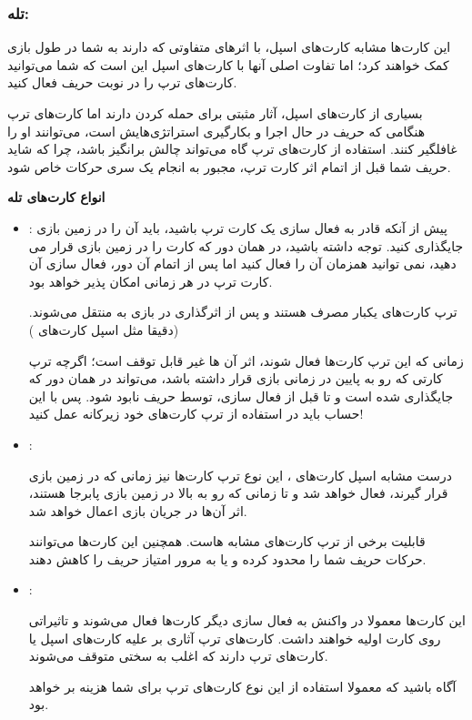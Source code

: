 \documentclass[]{article}
\begin{document}
\subsubsection*{{\titr تله:}}

این کارت‌ها مشابه کارت‌های اسپل، با اثر‌های متفاوتی که دارند به شما در طول بازی کمک خواهند کرد؛ اما تفاوت اصلی آنها با کارت‌های اسپل این است که شما می‌توانید کارت‌های ترپ را در نوبت حریف فعال کنید.

بسیاری از کارت‌های اسپل، آثار مثبتی برای حمله کردن دارند اما کارت‌های ترپ هنگامی که حریف در حال اجرا و بکارگیری استراتژی‌هایش است، می‌توانند او را غافلگیر کنند. استفاده از کارت‌های ترپ گاه می‌تواند چالش برانگیز باشد، چرا که شاید حریف شما قبل از اتمام اثر کارت ترپ، مجبور به انجام یک سری حرکات خاص شود.


\textbf{انواع کارت‌های تله}

\begin{itemize}
	\item {}:
پیش از آنکه قادر به فعال سازی یک کارت ترپ باشید، باید آن را در زمین بازی جایگذاری کنید. توجه داشته باشید، در همان دور که کارت را در زمین بازی قرار می دهید، نمی توانید همزمان آن را فعال کنید اما پس از اتمام آن دور، فعال سازی آن کارت ترپ در هر زمانی امکان پذیر خواهد بود.

ترپ کارت‌های  یکبار مصرف هستند و پس از اثرگذاری در بازی به  منتقل می‌شوند.(دقیقا مثل اسپل کارت‌های )

زمانی که این ترپ کارت‌ها فعال شوند، اثر آن ها غیر قابل توقف است؛ اگرچه ترپ کارتی که رو به پایین در زمانی بازی قرار داشته باشد، می‌تواند در همان دور که جایگذاری شده است و  تا قبل از فعال سازی، توسط حریف نابود شود. پس با این حساب باید در استفاده از ترپ کارت‌های خود زیرکانه عمل کنید!


	\item {}: 
	
درست مشابه اسپل کارت‌های ، این نوع ترپ کارت‌ها نیز زمانی که در زمین بازی قرار گیرند، فعال خواهد شد و تا زمانی که رو به بالا در زمین بازی پابرجا هستند، اثر آن‌ها در جریان بازی اعمال خواهد شد.

قابلیت برخی از ترپ کارت‌های   مشابه    هاست. همچنین این کارت‌ها می‌توانند حرکات حریف شما را محدود کرده و یا به مرور امتیاز حریف را کاهش دهند.

	
	\item {}:
	
این کارت‌ها معمولا در واکنش به فعال سازی دیگر کارت‌ها فعال می‌شوند و تاثیراتی روی کارت اولیه خواهند داشت.
کارت‌های ترپ  آثاری بر علیه کارت‌های اسپل    یا کارت‌های ترپ   دارند که اغلب به سختی متوقف می‌شوند.

آگاه باشید که معمولا استفاده از این نوع کارت‌های ترپ برای شما هزینه بر خواهد بود.
	
\end{itemize}
\end{document}
